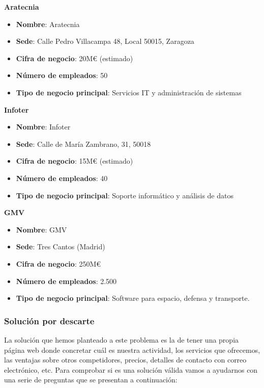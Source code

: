 \documentclass[11.5pt]{article}
\begin{document}
	\noindent\textbf{{\large Aratecnia}}
	
	\begin{itemize}
		\item \textbf{Nombre}: Aratecnia
		\item 	\textbf{Sede}: Calle Pedro Villacampa 48, Local 50015, Zaragoza
		\item 	\textbf{Cifra de negocio}: 20M€ (estimado)
		\item 	\textbf{Número de empleados}: 50
		\item 	\textbf{Tipo de negocio principal}: Servicios IT y administración de sistemas
	\end{itemize}
	
	\noindent\textbf{{\large Infoter}}
	
	\begin{itemize}
		\item \textbf{Nombre}: Infoter
		\item 	\textbf{Sede}: Calle de María Zambrano, 31, 50018
		\item 	\textbf{Cifra de negocio}: 15M€ (estimado)
		\item 	\textbf{Número de empleados}: 40
		\item 	\textbf{Tipo de negocio principal}: Soporte informático y análisis de datos
	\end{itemize}
	
	\noindent\textbf{{\large GMV}}
	
	\begin{itemize}
		\item \textbf{Nombre}: GMV
		\item 	\textbf{Sede}: Tres Cantos (Madrid)
		\item 	\textbf{Cifra de negocio}: 250M€
		\item 	\textbf{Número de empleados}: 2.500	
		\item 	\textbf{Tipo de negocio principal}: Software para espacio, defensa y transporte.
	\end{itemize}
	
	\subsubsection{Solución por descarte}
	
	La solución que hemos planteado a este problema es la de tener una propia página web donde concretar cuál
	es nuestra actividad, los servicios que ofrecemos, las ventajas sobre otros competidores, precios, detalles de
	contacto con correo electrónico, etc. Para comprobar si es una solución válida vamos a ayudarnos con una
	serie de preguntas que se presentan a continuación:
	
\end{document}
